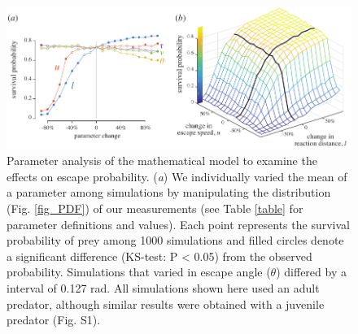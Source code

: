 \documentclass[]{rsos}%
\begin{document}
\begin{figure}[!h]
\centering
	\includegraphics[width=5.5in]{fig_sensitivity}
\caption{Parameter analysis of the mathematical model to examine the effects on escape probability.  
(\textit{a}) We individually varied the mean of a parameter among simulations by manipulating the distribution (Fig. \ref{fig_PDF}) of our measurements (see Table \ref{table} for parameter definitions and values). 
Each point represents the survival probability of prey among 1000 simulations and filled circles denote a significant difference (KS-test: P < 0.05) from the observed probability.
Simulations that varied in escape angle ($\theta$) differed by a interval of 0.127 rad.
All simulations shown here used an adult predator, although similar results were obtained with a juvenile predator (Fig. S1).
}
\label{fig_sense}
\end{figure}

\pagebreak
\end{document}
